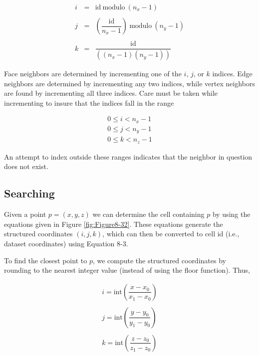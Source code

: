 \begin{equation}\label{eq:8.29}
\begin{array}{lll}
i &=& \text{id}\ \text{modulo}\ (n_x - 1) \\ \\
j &=& \left( \dfrac{\text{id}}{n_x - 1} \right)\ \text{modulo}\ (n_y - 1) \\ \\
k &=& \dfrac{\text{id}}{\left((n_x - 1)(n_y - 1)\right)}
\end{array}
\end{equation}

Face neighbors are determined by incrementing one of the $i$, $j$, or $k$ indices. Edge neighbors are determined by incrementing any two indices, while vertex neighbors are found by incrementing all three indices. Care must be taken while incrementing to insure that the indices fall in the range

\begin{equation}\label{eq:8.30}
\begin{array}{l}
0 \leq i < n_x - 1 \\
0 \leq j < n_y - 1 \\
0 \leq k < n_z - 1
\end{array}
\end{equation}

An attempt to index outside these ranges indicates that the neighbor in question does not exist.

\subsection{Searching}
\label{subsec:searching}

Given a point $p = (x, y, z)$ we can determine the cell containing $p$ by using the equations given in Figure \ref{fig:Figure8-32}. These equations generate the structured coordinates $(i, j, k)$, which can then be converted to cell id (i.e., dataset coordinates) using Equation 8-3.

To find the closest point to $p$, we compute the structured coordinates by rounding to the nearest integer value (instead of using the floor function). Thus,

\begin{equation}\label{eq:8.31}
\begin{array}{lll}
i = \text{int}\left( \dfrac{x-x_0}{x_1 - x_0} \right) \\ \\
j = \text{int}\left( \dfrac{y-y_0}{y_1 - y_0} \right) \\ \\
k = \text{int}\left( \dfrac{z-z_0}{z_1 - z_0} \right)
\end{array}
\end{equation}

